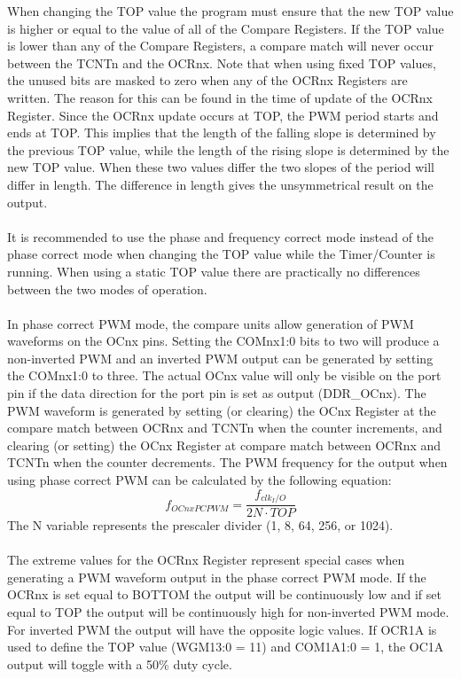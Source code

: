 \documentclass[english]{article}
\begin{document}
When changing the TOP value the program must ensure that the new TOP value is higher or equal to the value of all of the Compare Registers. If the TOP value is lower than any of the Compare Registers, a compare match will never occur between the TCNTn and the OCRnx. Note that when using fixed TOP values, the unused bits are masked to zero when any of the OCRnx Registers are written. The reason for this can be found in the time of update of the OCRnx Register. Since the OCRnx update occurs at TOP, the PWM period starts and ends at TOP. This implies that the length of the falling slope is determined by the previous TOP value, while the length of the rising slope is determined by the new TOP value. When these two values differ the two slopes of the period will differ in length. The difference in length gives the unsymmetrical result on the output.\\\\
It is recommended to use the phase and frequency correct mode instead of the phase correct mode when changing the TOP value while the Timer/Counter is running. When using a static TOP value there are practically no differences between the two modes of operation.\\\\
In phase correct PWM mode, the compare units allow generation of PWM waveforms on the OCnx pins. Setting the COMnx1:0 bits to two will produce a non-inverted PWM and an inverted PWM output can be generated by setting the COMnx1:0 to three. The actual OCnx value will only be visible on the port pin if the data direction for the port pin is set as output (DDR\_OCnx). The PWM waveform is generated by setting (or clearing) the OCnx Register at the compare match between OCRnx and TCNTn when the counter increments, and clearing (or setting) the OCnx Register at compare match between OCRnx and TCNTn when the counter decrements. The PWM frequency for the output when using phase correct PWM can be calculated by the following equation:
$$
f_{OCnxPCPWM}=\frac{f_{clk_I/O}}{2N \cdot TOP}
$$
The
N
variable represents the prescaler divider (1, 8, 64, 256, or 1024).\\\\
The extreme values for the OCRnx Register represent special cases when generating a PWM waveform output in the phase correct PWM mode. If the OCRnx is set equal to BOTTOM the output will be continuously low and if set equal to TOP the output will be continuously high for non-inverted PWM mode. For inverted PWM the output will have the opposite logic values. If OCR1A is used to define the TOP value (WGM13:0 = 11) and COM1A1:0 = 1, the OC1A output will toggle with a 50\% duty cycle.
\end{document}
